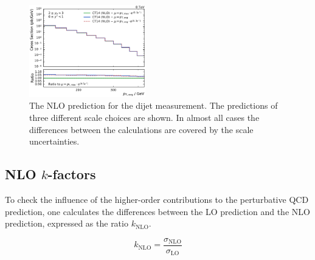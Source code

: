 \begin{figure}[htp]
    \includegraphics[width=0.45\textwidth]{figures/theory/nlo_xs_comp_yb2ys0.pdf}
    \caption{The NLO prediction \NLOJETPP for the dijet measurement. The
    predictions of three different scale choices are shown. In almost all cases
    the differences between the calculations are covered by the scale uncertainties.}
    \label{fig:xs_nlo_comp}
\end{figure}


\subsection{NLO $k$-factors}

To check the influence of the higher-order contributions to the perturbative QCD
prediction, one calculates the differences between the LO prediction and the NLO
prediction, expressed as the ratio $k_\mathrm{NLO}$.

\begin{equation*}
    k_{\mathrm{NLO}} = \frac{\sigma_{\mathrm{NLO}}}{\sigma_{\mathrm{LO}}}
\end{equation*}

